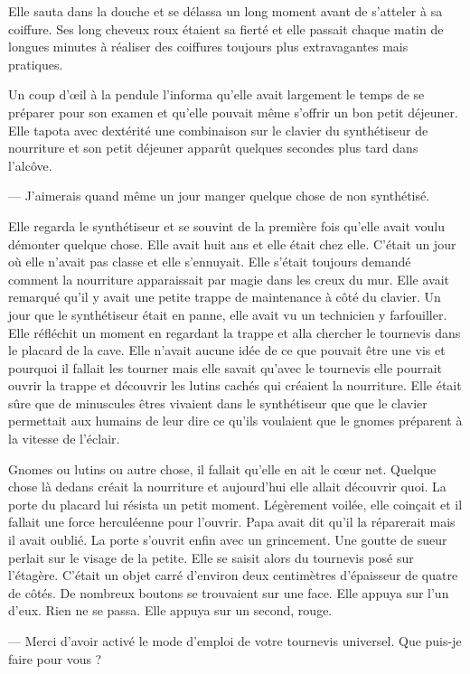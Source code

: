 Elle sauta dans la douche et se délassa un long moment avant de s'atteler à sa
coiffure. Ses long cheveux roux étaient sa fierté et elle passait chaque matin
de longues minutes à réaliser des coiffures toujours plus extravagantes mais
pratiques.

Un coup d'œil à la pendule l'informa qu'elle avait largement le temps de se
préparer pour son examen et qu'elle pouvait même s'offrir un bon petit déjeuner.
Elle tapota avec dextérité une combinaison sur le clavier du synthétiseur de
nourriture et son petit déjeuner apparût quelques secondes plus tard dans
l’alcôve.

  — J'aimerais quand même un jour manger quelque chose de non synthétisé.

Elle regarda le synthétiseur et se souvint de la première fois qu'elle avait 
voulu démonter quelque chose. Elle avait huit ans et elle était chez elle.
C'était un jour où elle n'avait pas classe et elle s'ennuyait. Elle s'était
toujours demandé comment la nourriture apparaissait par magie dans les creux du
mur. Elle avait remarqué qu'il y avait une petite trappe de maintenance à côté
du clavier. Un jour que le synthétiseur était en panne, elle avait vu un
technicien y farfouiller. Elle réfléchit un moment en regardant la trappe et
alla chercher le tournevis dans le placard de la cave. Elle n'avait aucune idée
de ce que pouvait être une vis et pourquoi il fallait les tourner mais elle
savait qu'avec le tournevis elle pourrait ouvrir la trappe et découvrir les
lutins cachés qui créaient la nourriture. Elle était sûre que de minuscules
êtres vivaient dans le synthétiseur que que le clavier permettait aux humains de
leur dire ce qu'ils voulaient que le gnomes préparent à la vitesse de l'éclair.

Gnomes ou lutins ou autre chose, il fallait qu'elle en ait le cœur net.
Quelque chose là dedans créait la nourriture et aujourd'hui elle allait
découvrir quoi. La porte du placard lui résista un petit moment. Légèrement
voilée, elle coinçait et il fallait une force herculéenne pour l'ouvrir. Papa
avait dit qu'il la réparerait mais il avait oublié. La porte s'ouvrit enfin avec
un grincement. Une goutte de sueur perlait sur le visage de la petite. Elle se
saisit alors du tournevis posé sur l'étagère. C'était un objet carré d'environ
deux centimètres d'épaisseur de quatre de côtés. De nombreux boutons se
trouvaient sur une face. Elle appuya sur l'un d'eux. Rien ne se passa. Elle
appuya sur un second, rouge.

  — Merci d'avoir activé le mode d'emploi de votre tournevis universel. Que
puis-je faire pour vous ?

